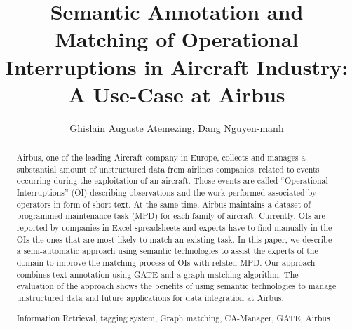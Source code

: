 \documentclass[runningheads,a4paper]{{llncs}}
\newcommand{\keywords}[1]{\par\addvspace\baselineskip
\noindent\keywordname\enspace\ignorespaces#1}
\begin{document}
\title{Semantic Annotation and Matching of Operational Interruptions in Aircraft Industry: A Use-Case at Airbus}

\author{ Ghislain Auguste Atemezing, Dang Nguyen-manh }

  




\maketitle


\begin{abstract}

Airbus, one of the leading Aircraft company in Europe, collects and manages a substantial amount of unstructured data from airlines companies, related to events occurring during the exploitation of an aircraft. Those events are called ``Operational Interruptions'' (OI) describing observations and the work performed associated by operators in form of short text. At the same time, Airbus maintains a dataset of programmed maintenance task (MPD) for each family of aircraft.  Currently, OIs are reported by companies  in Excel spreadsheets and experts have to find manually in the OIs the ones that are most likely to match an existing task. In this paper, we describe a semi-automatic approach using semantic technologies to assist the experts of the domain to improve the matching process of OIs with related MPD. Our approach combines text annotation using GATE and a graph matching algorithm. The evaluation of the approach shows the benefits of using semantic technologies to manage unstructured data and future applications for data integration at Airbus.    

\keywords{Information Retrieval, tagging system, Graph matching, CA-Manager, GATE, Airbus}
\end{abstract}
\end{document}
